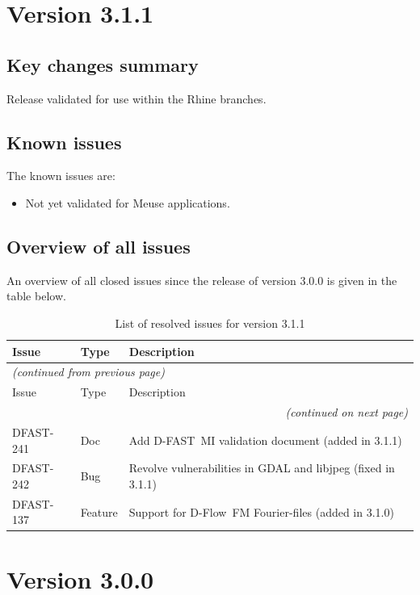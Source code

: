\documentclass[git]{deltares_manual}
\newcommand{\dfmi}{\textrm{D-FAST~MI}\xspace}
\newcommand{\dflowfm}{\textrm{D-Flow~FM}\xspace}
\begin{document}
\section{Version 3.1.1}

\subsection{Key changes summary}
Release validated for use within the Rhine branches.

\subsection{Known issues}

The known issues are:

\begin{itemize}
\item Not yet validated for Meuse applications.
\end{itemize}

\subsection{Overview of all issues}

An overview of all closed issues since the release of version 3.0.0 is given in the table below.

\begin{longtable}{l|l|p{8cm}}
\caption{List of resolved issues for version 3.1.1} \\
Issue & Type & Description \\ \hline
\endfirsthead
\multicolumn{3}{l}{\textsl{(continued from previous page)}} \\
Issue & Type & Description \\ \hline
\endhead
\hline \multicolumn{3}{r}{\textsl{(continued on next page)}} \\
\endfoot
\endlastfoot 
DFAST-241 & Doc & Add \dfmi validation document (added in 3.1.1) \\
DFAST-242 & Bug & Revolve vulnerabilities in GDAL and libjpeg (fixed in 3.1.1) \\
DFAST-137 & Feature & Support for \dflowfm Fourier-files (added in 3.1.0) \\
\end{longtable}

\section{Version 3.0.0}
\end{document}
